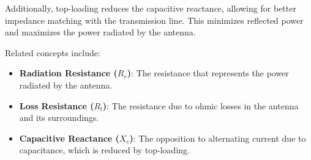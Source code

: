 Additionally, top-loading reduces the capacitive reactance, allowing for better impedance matching with the transmission line. This minimizes reflected power and maximizes the power radiated by the antenna.

Related concepts include:
\begin{itemize}
    \item \textbf{Radiation Resistance (\(R_r\))}: The resistance that represents the power radiated by the antenna.
    \item \textbf{Loss Resistance (\(R_l\))}: The resistance due to ohmic losses in the antenna and its surroundings.
    \item \textbf{Capacitive Reactance (\(X_c\))}: The opposition to alternating current due to capacitance, which is reduced by top-loading.
\end{itemize}

